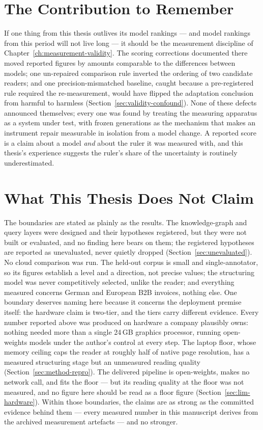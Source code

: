 \section*{The Contribution to Remember}

If one thing from this thesis outlives its model rankings --- and model rankings from
this period will not live long --- it should be the measurement discipline of
Chapter~\ref{ch:measurement-validity}. The scoring corrections documented there moved
reported figures by amounts comparable to the differences between models; one
un-repaired comparison rule inverted the ordering of two candidate readers; and one
precision-mismatched baseline, caught because a pre-registered rule required the
re-measurement, would have flipped the adaptation conclusion from harmful to harmless
(Section~\ref{sec:validity-confound}). None of these defects announced themselves; every one
was found by treating the measuring apparatus as a system under test, with frozen
generations as the mechanism that makes an instrument repair measurable in isolation
from a model change. A reported score is a claim about a model \emph{and} about the
ruler it was measured with, and this thesis's experience suggests the ruler's share of
the uncertainty is routinely underestimated.

\section*{What This Thesis Does Not Claim}

The boundaries are stated as plainly as the results. The knowledge-graph and query
layers were designed and their hypotheses registered, but they were not built or
evaluated, and no finding here bears on them; the registered hypotheses are reported as
unevaluated, never quietly dropped (Section~\ref{sec:unevaluated}). No cloud comparison
was run. The held-out corpus is small and single-annotator, so its figures establish a
level and a direction, not precise values; the structuring model was never
competitively selected, unlike the reader; and everything measured concerns German and
European \ac{B2B} invoices, nothing else. One boundary deserves naming here because it
concerns the deployment premise itself: the hardware claim is two-tier, and the tiers carry
different evidence. Every number reported above was produced on hardware a company plausibly owns:
nothing needed more than a single 24\,\ac{GB} graphics processor, running open-weights models
under the author's control at every step. The laptop floor, whose memory ceiling caps
the reader at roughly half of native page resolution, has a measured structuring stage but an
unmeasured reading quality (Section~\ref{sec:method-repro}). The delivered pipeline is open-weights,
makes no network call, and fits the floor --- but its reading quality at the floor was not
measured, and no figure here should be read as a floor figure
(Section~\ref{sec:lim-hardware}). Within those boundaries, the claims are as
strong as the committed evidence behind them --- every measured number in this manuscript
derives from the archived measurement artefacts --- and no stronger.

